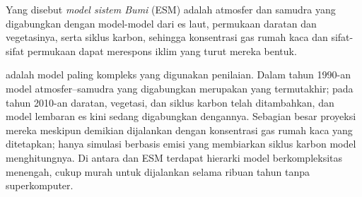 \begin{omfigure}
\par{}\label{fig:b3:climate-models:grid}
\end{omfigure}

\begin{definition}\label{def:b3:climate-models:esm}
Yang disebut \emph{model sistem Bumi} (ESM) adalah 
atmosfer dan samudra yang digabungkan dengan model-model dari
es laut, permukaan daratan dan vegetasinya, serta siklus karbon, sehingga
konsentrasi gas rumah kaca dan sifat-sifat permukaan
dapat merespons iklim yang turut mereka bentuk.
\end{definition}

 adalah model paling kompleks yang digunakan penilaian. Dalam
tahun 1990-an model atmosfer--samudra yang digabungkan merupakan yang termutakhir;
pada tahun 2010-an daratan, vegetasi, dan siklus karbon telah ditambahkan, dan
model lembaran es kini sedang digabungkan dengannya. Sebagian besar proyeksi mereka
meskipun demikian dijalankan dengan konsentrasi gas rumah kaca yang ditetapkan;
hanya simulasi berbasis emisi yang membiarkan siklus karbon model menghitungnya.
Di antara  dan ESM terdapat hierarki model
berkompleksitas menengah, cukup murah untuk dijalankan selama
ribuan tahun tanpa superkomputer.

